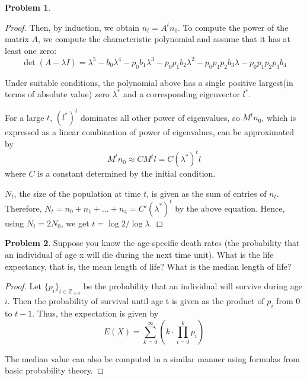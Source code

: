 \documentclass[12pt]{report}
\theoremstyle{definition}
\newtheorem{problem}{Problem}[chapter]
\begin{document}
\begin{problem}
\begin{proof}
            Then, by induction, we obtain $n_t = A^{t}n_0$.
            To compute the power of the matrix $A$, we compute the characteristic polynomial and assume that it has at least one zero:
            \begin{equation*}
                \det{(A-\lambda I)} = \lambda^5 -b_0\lambda^4 -p_0b_1\lambda^3 - p_0p_1b_2\lambda^2 - p_0p_1p_2b_3\lambda - p_0p_1p_2p_3b_4 
            \end{equation*}
            
            Under suitable conditions, the polynomial above has a single positive largest(in terms of absolute value) zero $\lambda^*$ and a corresponding eigenvector $l^*$.

            For a large $t$, $({l^*})^t$ dominates all other power of eigenvalues, so $M^t n_0$, which is expressed as a linear combination of power of eigenvalues, can be approximated by
            \begin{equation*}
                M^{t} n_0 \approx C M^{t} l = C {(\lambda^*)}^t l
            \end{equation*}
            where $C$ is a constant determined by the initial condition.

            $N_t$, the size of the population at time $t$, is given as the sum of entries of $n_t$.
            Therefore, $N_t = n_0 + n_1 + \ldots + n_4 = C' (\lambda^*)^t$ by the above equation.
            Hence, using $N_t = 2N_0$, we get $t = \log{2}/\log{\lambda}$.
        \end{proof}
    \end{problem}

    \begin{problem}
        Suppose you know the age-specific death rates (the probability that an individual of age x will die during the next time unit). What is the life expectancy, that is, the mean length of life? What is the median length of life?

        \begin{proof}
            Let $\{p_i\}_{i \in \mathbb{Z}_{\geq 0}}$ be the probability that an individual will survive during age $i$.
            Then the probability of survival until age t is given as the product of $p_i$ from $0$ to $t-1$.
            Thus, the expectation is given by
            \begin{equation*}
                E(X) = \sum_{k=0}^{\infty} \left( k \cdot \prod_{i=0}^{k}p_i \right)
            \end{equation*}

            The median value can also be computed in a similar manner using formulas from basic probability theory.
        \end{proof}
    \end{problem}
\end{document}

